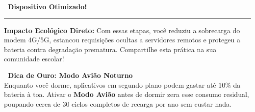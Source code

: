 \documentclass[11pt]{article}
\begin{document}
\newpage

\begin{center}
    \Large{\textbf{\textcolor{AdguardGreen}{\faCheckCircle \ Dispositivo Otimizado!}}}
    \vspace{2mm}
    \hrule
\end{center}

\vspace{2mm}

{\small \textbf{Impacto Ecológico Direto:} Com essas etapas, você reduziu a sobrecarga do modem 4G/5G, estancou requisições ocultas a servidores remotos e protegeu a bateria contra degradação prematura. Compartilhe esta prática na sua comunidade escolar!}

\vspace{3mm}

\begin{tcolorbox}[colback=NordBg, coltext=NordText, colframe=NordSky, boxrule=0.8pt, arc=3pt, left=2mm, right=2mm, top=1.5mm, bottom=1.5mm]
    \textbf{\textcolor{NordSky}{\faMoon \ Dica de Ouro: Modo Avião Noturno}} \\[1mm]
    {\scriptsize Enquanto você dorme, aplicativos em segundo plano podem gastar até 10\% da bateria à toa. Ativar o \textbf{Modo Avião} antes de dormir zera esse consumo residual, poupando cerca de 30 ciclos completos de recarga por ano sem custar nada.}
\end{tcolorbox}

\vspace{2mm}
\end{document}
